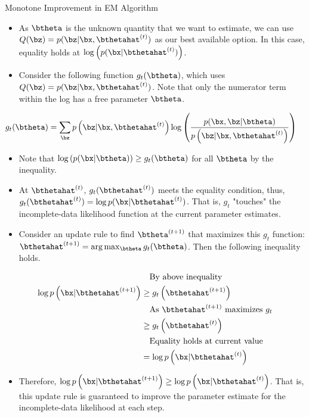 \documentclass[dvipdfmx,bigger,aspectratio=169]{beamer}
\begin{document}
\begin{frame}[allowframebreaks,label=,t]{Monotone Improvement in EM Algorithm}
\begin{itemize}
\item As \(\btheta\) is the unknown quantity that we want to estimate, we can use \(Q(\bz) = p(\bz | \bx, \bthetahat^{(t)})\) as our best available option. In this case, equality holds at \(\log \left( p(\bx | \bthetahat^{(t)}) \right)\).
\item Consider the following function \(g_{t}(\btheta)\), which uses \(Q(\bz) = p(\bz | \bx, \bthetahat^{(t)})\). Note that only the numerator term within the log has a free parameter \(\btheta\). \cite{doWhatExpectationMaximization2008}
\end{itemize}
\footnotesize
\begin{align*}
  g_{t}(\btheta) &= \sum_{\bz} p \left( \bz | \bx, \bthetahat^{(t)} \right) \log \left( \frac{p(\bx,\bz | \btheta)}{p \left( \bz | \bx, \bthetahat^{(t)} \right)} \right)
\end{align*}
\normalsize
\begin{itemize}
\item Note that \(\log \left( p(\bx | \btheta) \right) \ge g_{t}(\btheta)\) for all \(\btheta\) by the inequality.
\item At \(\bthetahat^{(t)}\), \(g_{t}(\bthetahat^{(t)})\) meets the equality condition, thus, \(g_{t}(\bthetahat^{(t)}) = \log p(\bx | \bthetahat^{(t)})\). That is, \(g_{t}\) "touches" the incomplete-data likelihood function at the current parameter estimates. \cite{murphyMachineLearningProbabilistic2012}
\item Consider an update rule to find \(\btheta^{(t+1)}\) that maximizes this \(g_{t}\) function: \(\bthetahat^{(t+1)} = \arg\max_{\btheta} g_{t}(\btheta)\). Then the following inequality holds.
\end{itemize}
\footnotesize
\begin{align*}
  &~~~\text{By above inequality}\\
  \log p \left( \bx | \bthetahat^{(t+1)} \right)
  &\ge g_{t}\left( \bthetahat^{(t+1)} \right)\\
  &~~~\text{As $\bthetahat^{(t+1)}$ maximizes $g_{t}$}\\
  &\ge g_{t}\left( \bthetahat^{(t)} \right)\\
  &~~~\text{Equality holds at current value}\\
  &= \log p \left( \bx | \bthetahat^{(t)} \right)
\end{align*}
\normalsize
\begin{itemize}
\item Therefore, \(\log p \left( \bx | \bthetahat^{(t+1)} \right) \ge \log p \left( \bx | \bthetahat^{(t)} \right)\). That is, this update rule is guaranteed to improve the parameter estimate for the incomplete-data likelihood at each step.

\end{itemize}
\end{frame}
\end{document}

